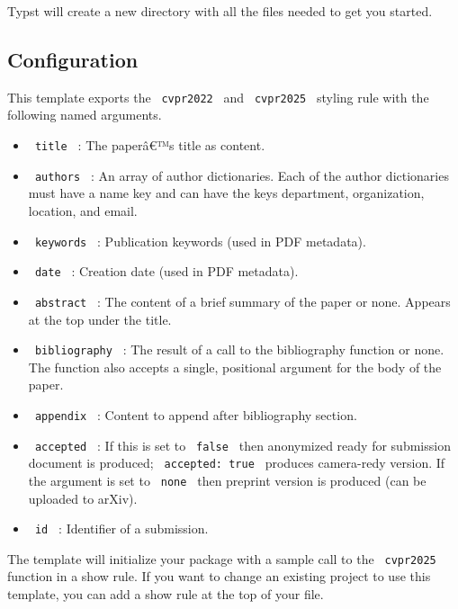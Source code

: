 Typst will create a new directory with all the files needed to get you
started.

\subsection{Configuration}\label{configuration}

This template exports the \texttt{\ cvpr2022\ } and
\texttt{\ cvpr2025\ } styling rule with the following named arguments.

\begin{itemize}
\tightlist
\item
  \texttt{\ title\ } : The paperâ€™s title as content.
\item
  \texttt{\ authors\ } : An array of author dictionaries. Each of the
  author dictionaries must have a name key and can have the keys
  department, organization, location, and email.
\item
  \texttt{\ keywords\ } : Publication keywords (used in PDF metadata).
\item
  \texttt{\ date\ } : Creation date (used in PDF metadata).
\item
  \texttt{\ abstract\ } : The content of a brief summary of the paper or
  none. Appears at the top under the title.
\item
  \texttt{\ bibliography\ } : The result of a call to the bibliography
  function or none. The function also accepts a single, positional
  argument for the body of the paper.
\item
  \texttt{\ appendix\ } : Content to append after bibliography section.
\item
  \texttt{\ accepted\ } : If this is set to \texttt{\ false\ } then
  anonymized ready for submission document is produced;
  \texttt{\ accepted:\ true\ } produces camera-redy version. If the
  argument is set to \texttt{\ none\ } then preprint version is produced
  (can be uploaded to arXiv).
\item
  \texttt{\ id\ } : Identifier of a submission.
\end{itemize}

The template will initialize your package with a sample call to the
\texttt{\ cvpr2025\ } function in a show rule. If you want to change an
existing project to use this template, you can add a show rule at the
top of your file.

